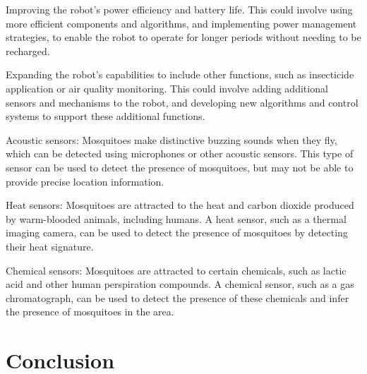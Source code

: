 \documentclass[11pt]{article}
\begin{document}
	Improving the robot's power efficiency and battery life. This could involve using more efficient components and algorithms, and implementing power management strategies, to enable the robot to operate for longer periods without needing to be recharged.
	
	Expanding the robot's capabilities to include other functions, such as insecticide application or air quality monitoring. This could involve adding additional sensors and mechanisms to the robot, and developing new algorithms and control systems to support these additional functions.
	
	
	Acoustic sensors: Mosquitoes make distinctive buzzing sounds when they fly, which can be detected using microphones or other acoustic sensors. This type of sensor can be used to detect the presence of mosquitoes, but may not be able to provide precise location information.
	
	Heat sensors: Mosquitoes are attracted to the heat and carbon dioxide produced by warm-blooded animals, including humans. A heat sensor, such as a thermal imaging camera, can be used to detect the presence of mosquitoes by detecting their heat signature.
	
	Chemical sensors: Mosquitoes are attracted to certain chemicals, such as lactic acid and other human perspiration compounds. A chemical sensor, such as a gas chromatograph, can be used to detect the presence of these chemicals and infer the presence of mosquitoes in the area.
	
	
	
	

	
	
	\section{Conclusion}
	
	
	
	
	
\end{document}
